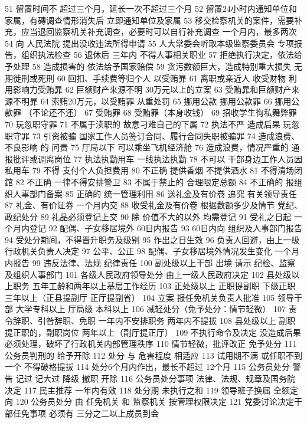 \documentclass[cyan]{elegantnote}
\begin{document}
\begin{enumerate}
51 留置时间不 超过三个月，延长一次不超过三个月
52 留置24小时内通知单位和家属，有磚调查情形消失后 立即通知单位及家属
53 移交检察机关的案件，需要补充，应当退回监察机关补充调查，必要时可以自行补充调查
一个月内，最多两次
54 向 人民法院 提出没收违法所得申请
55 人大常委会听取本级监察委员会 专项报告，组织执法检查
56 退休后 三年内 不得人事相关职业
57 拒绝执行决定，依法给予处理
58 造成损害的 依法给予国家赔偿
59 贪污数额巨大，造成特别重大损失 无期徙刑或死刑
60 回扣、手续费等归个人 以受贿暃
61 离职或亲近人 收受财物 利用影响力受贿暃
62 巨额财产来源不明 30万元以上的立案
63 受贿暃和巨额财产来源不明暃
64 索贿20万元，以受贿罪 从重处罚
65 挪用公款 挪用公款罪
66 挪用公款罪 （不论还不还）
67 受贿罪
68 受贿罪（本身收钱）
69 招收学生徇私舞弊罪
70 玩忽职守罪
71 不属于渎职的 故意刁难自己的下属
72 执法不严 造成后果 玩忽职守罪
73 引资被骗 国家工作人员签订合同、履行合同失职被骗罪
74 造成浪费、不良影响 的 问责
75 厅局以下 可以乘坐飞机经济舱
76 造成浪费，情况严重的 通报批评或调离岗位
77 执法执勤用车 一线执法执勤
78 不可以 干部身边工作人员因私用车
79 不得 支付个人负担费用
80 不正确 提供香烟 不提供酒水
81 不得清场闭錧
82 不正确 一律不得安排警卫
83 不属于禁止的 合理限定总额
84 不正确的 报组织人事部门备案
85 正确的 统一管理利用
86 送礼金及有价卷 追究 有关领导责任
87 礼金、有价证券 一个月内交
88 收受礼金及有价卷 根据数额多少及情节 党纪、政纪处分
89 礼品必须登记上交
90 除 价值不大的以外 均需登记
91 受礼之日起 一个月内登记
92 配偶、子女移居境外 60日内报告
93 60日内向 组织及人事部门报告
94 受处分期间，不得晋升职务及级别
95 作出之日生效
96 负责人回避，由上一级行政机关负责人决定
97 公平、公正
98 配偶、子女移居境外情况发生变化 一个月内报告
99 违反法律、法规 纪律责任
100 副处级以上干部 出境 请示 纪检、监察及组织人事部门
101 各级人民政府领导处分 由上一级人民政府决定
102 县处级以上职务 五年工龄和两年以上基层工作经历
103 正处级以上 正职提副职 下级正职 三年以上（正县提副厅 正厅提副省）
104 立案 报任免机关负责人批准
105 领导干部 大学专科以上 厅局级 本科以上
106 减轻处分（免予处分：情节轻微）
107 责令辞职、引咎辞职、免职 一年内不安排职务 两年内不提拔
108 县处级以上 副职提正职的，副职岗位 两年以上（副厅提正厅）
109 不执行命令及决定 没造成后果 必须处理，破坏了行政机关内部管理秩序
110 情节轻微，批评改正 免予处分
111 公务员判刑的 给予开除
112 处分 与 危害程度 相适应
113 试用期不满 或任职不到 一个 不得破格提拔
114 处分6个月内作出，最长不超过 12个月
115 公务员处分 警告 记过 记大过 降级 撤职 开除
116 公务员处分事项 法律、法规、规章及国务院决定
117 民主推荐 一年内有效
118 处分期 未执行之和
119 领导班子换届 全额定向
120 公务员处分 由 任免机关 和 监察机关 按管理权限决定
121 党委讨论决定干部任免事项 必须有 三分之二以上成员到会

\end{enumerate}
\end{document}

